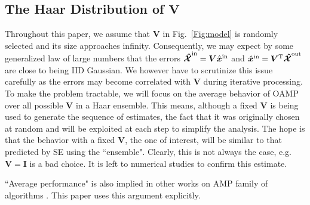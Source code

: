 \documentclass[journal]{IEEEtran}
\renewcommand{\bf}{\bm}
\begin{document}
\subsection{The Haar Distribution of \texorpdfstring{$\bf{V}$}{TEXT}}

Throughout this paper, we assume that $\bf{V}$ in Fig.~\ref{Fig:model} is randomly selected and its size approaches infinity. Consequently, we may expect by some generalized law of large numbers that the errors $\bf{\mathcal{\hat{X}}}^{\rm in}= \bf{V}\hat{\bf{x}}^{\rm in}$ and  $\hat{\bf{x}}^{\rm in}= \bf{V}^{\rm T}\bf{\mathcal{\hat{X}}}^{\rm out}$ are close to being IID Gaussian. We however have to scrutinize this issue carefully as the errors may become correlated with $\bf{V}$ during iterative processing. To make the problem tractable, we will focus on the average behavior of OAMP over all possible $\bf{V}$ in a Haar ensemble. This means, although a fixed $\bf{V}$ is being used to generate the sequence of estimates, the fact that it was originally chosen at random and will be exploited at each step to simplify the analysis. The hope is that the behavior with a fixed $\bf{V}$, the one of interest, will be similar to that predicted by SE using the ``ensemble". Clearly, this is not always the case, e.g. $\bf{V}=\bf{I}$ is a bad choice. It is left to numerical studies to confirm this estimate. 

``Average performance" is also implied in other works on AMP family of algorithms \cite{Donoho2009, Takeuchi2019, Bayati2011, Rangan2016, Takeuchi2017}. This paper uses this argument explicitly. 




\end{document}
